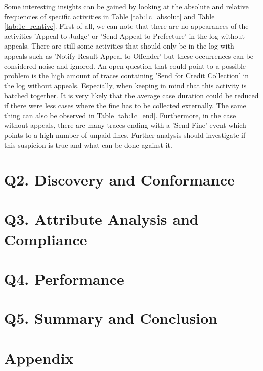 \documentclass[12pt]{report}
\begin{document}
Some interesting insights can be gained by looking at the absolute and relative frequencies of specific activities in Table \ref{tab:1c_absolut} and Table \ref{tab:1c_relative}.
First of all, we can note that there are no appearances of the activities 'Appeal to Judge' or 'Send Appeal to Prefecture' in the log without appeals.
There are still some activities that should only be in the log with appeals such as 'Notify Result Appeal to Offender' but these occurrences can
be considered noise and ignored. An open question that could point to a possible problem is the high amount of traces containing 'Send for Credit Collection' in the log without appeals. Especially, when keeping in mind that this activity is batched together. It is very likely that the average
case duration could be reduced if there were less cases where the fine has to be collected externally. The same thing can also be observed in Table \ref{tab:1c_end}. Furthermore, in the case without appeals, there are many traces ending with a 'Send Fine' event which points to a high number of unpaid fines. Further analysis should investigate if this suspicion is true and what can be done against it.

\section{Q2. Discovery and Conformance}

\section{Q3. Attribute Analysis and Compliance}

\section{Q4. Performance}

\section{Q5. Summary and Conclusion}

\section*{Appendix}
\end{document}
